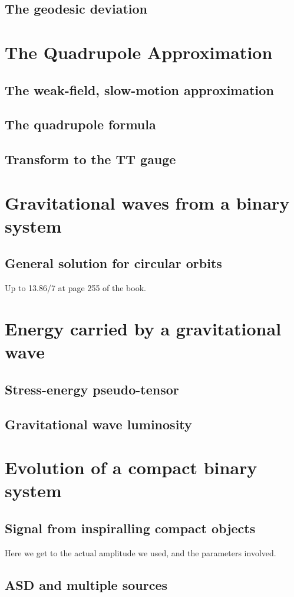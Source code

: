 \subsection{The geodesic deviation}

\section{The Quadrupole Approximation}
\subsection{The weak-field, slow-motion approximation}
\subsection{The quadrupole formula}
\subsection{Transform to the TT gauge}

\section{Gravitational waves from a binary system}
\subsection{General solution for circular orbits}
Up to 13.86/7 at page 255 of the book.

\section{Energy carried by a gravitational wave}
\subsection{Stress-energy pseudo-tensor}
\subsection{Gravitational wave luminosity}

\section{Evolution of a compact binary system}
\subsection{Signal from inspiralling compact objects}
Here we get to the actual amplitude we used, and the parameters involved.
\subsection{ASD and multiple sources}
